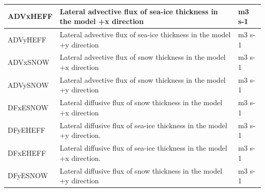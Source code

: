\begin{longtable}{|m{}|m{}|m{}|}
ADVxHEFF &Lateral advective flux of sea-ice thickness in the model +x direction &m3 s-1  \\ \hline
ADVyHEFF &Lateral advective flux of sea-ice thickness in the model +y direction &m3 s-1  \\ \hline
ADVxSNOW &Lateral advective flux of snow thickness in the model +x direction &m3 s-1  \\ \hline
ADVySNOW &Lateral advective flux of snow thickness in the model +y direction &m3 s-1  \\ \hline
DFxESNOW &Lateral diffusive flux of snow thickness in the model +x direction &m3 s-1  \\ \hline
DFyEHEFF &Lateral diffusive flux of sea-ice thickness in the model +y direction. &m3 s-1  \\ \hline
DFxEHEFF &Lateral diffusive flux of sea-ice thickness in the model +x direction. &m3 s-1  \\ \hline
DFyESNOW &Lateral diffusive flux of snow thickness in the model +y direction &m3 s-1  \\ \hline
\end{longtable}

\newp
\pagebreak

